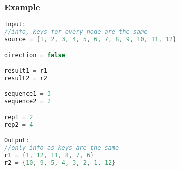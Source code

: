 \documentclass{article}
\begin{document}
\subsubsection*{Example}

\begin{lstlisting}[language=C++]
Input:
//info, keys for every node are the same
source = {1, 2, 3, 4, 5, 6, 7, 8, 9, 10, 11, 12}

direction = false

result1 = r1
result2 = r2

sequence1 = 3
sequence2 = 2

rep1 = 2
rep2 = 4

Output:
//only info as keys are the same
r1 = {1, 12, 11, 8, 7, 6}
r2 = {10, 9, 5, 4, 3, 2, 1, 12}
\end{lstlisting}
\end{document}
